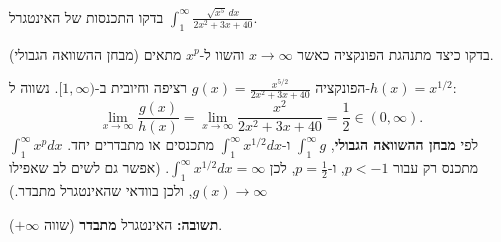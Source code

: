 
\begin{question}
בדקו התכנסות של האינטגרל $\displaystyle\int_1^{\infty}\frac{\sqrt{x^5}\,dx}{2x^2+3x+40}$.
\end{question}

\begin{hint}
בדקו כיצד מתנהגת הפונקציה כאשר $x\to\infty$ והשוו ל-$x^{p}$ מתאים (מבחן ההשוואה הגבולי).
\end{hint}

\begin{solution}
הפונקציה $g(x)=\frac{x^{5/2}}{2x^2+3x+40}$ רציפה וחיובית ב-$[1,\infty)$. נשווה ל-$h(x)=x^{1/2}$:
\[ \lim_{x\to\infty}\frac{g(x)}{h(x)}=\lim_{x\to\infty}\frac{x^2}{2x^2+3x+40}=\frac12\in(0,\infty). \]
לפי \textbf{מבחן ההשוואה הגבולי}, $\int_1^\infty g$ ו-$\int_1^\infty x^{1/2}dx$ מתכנסים או מתבדרים יחד. $\int_1^\infty x^{p}dx$ מתכנס רק עבור $p<-1$, ו-$p=\frac12$, לכן $\int_1^\infty x^{1/2}dx=\infty$.
(אפשר גם לשים לב שאפילו $g(x)\to\infty$, ולכן בוודאי שהאינטגרל מתבדר.)

\textbf{תשובה:} האינטגרל \textbf{מתבדר} (שווה $+\infty$).
\end{solution}

